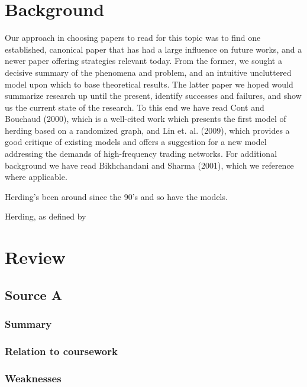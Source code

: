 \documentclass{article}
\begin{document}
\section{Background}
Our approach in choosing papers to read for this topic was to find one established, canonical paper that has had a large influence on future works, and a newer paper offering strategies relevant today.
From the former, we sought a decisive summary of the phenomena and problem, and an intuitive uncluttered model upon which to base theoretical results.
The latter paper we hoped would summarize research up until the present, identify successes and failures, and show us the current state of the research.
To this end we have read Cont and Bouchaud (2000), which is a well-cited work which presents the first model of herding based on a randomized graph, and Lin et. al. (2009), which provides a good critique of existing models and offers a suggestion for a new model addressing the demands of high-frequency trading networks.
For additional background we have read Bikhchandani and Sharma (2001), which we reference where applicable.

Herding's been around since the 90's and so have the models.

Herding, as defined by 

\section{Review}
\subsection{Source A}
\subsubsection{Summary}
\subsubsection{Relation to coursework}
\subsubsection{Weaknesses}
\end{document}
